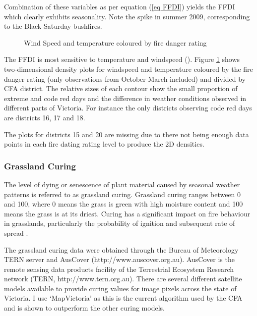 \documentclass[11pt,a4paper]{article}
\begin{document}
Combination of these variables as per equation (\ref{eq FFDI}) yields the FFDI which clearly exhibits seasonality. Note the spike in summer 2009, corresponding to the Black Saturday bushfires.

\begin{figure}[!ht]
	\centering 
	\caption{Wind Speed and temperature coloured by fire danger rating} 
	\label{fig:tw_fdr} 
\end{figure}

The FFDI is most sensitive to temperature and windspeed (\cite{dowdy10}). Figure \ref{fig:tw_fdr} shows two-dimensional density plots for windspeed and temperature coloured by the fire danger rating (only observations from October-March included) and divided by CFA district. The relative sizes of each contour show the small proportion of extreme and code red days and the difference in weather conditions observed in different parts of Victoria. For instance the only districts observing code red days are districts 16, 17 and 18. 

The plots for districts 15 and 20 are missing due to there not being enough data points in each fire dating rating level to produce the 2D densities.  
 
\subsubsection{Grassland Curing}
The level of dying or senescence of plant material caused by seasonal weather patterns is referred to as grassland curing. Grassland curing ranges between 0 and 100, where 0 means the grass is green with high moisture content and 100 means the grass is at its driest. Curing has a significant impact on fire behaviour in grasslands, particularly the probability of ignition and subsequent rate of spread \citep{cheney08}. 

The grassland curing data were obtained through the Bureau of Meteorology TERN server and AusCover (http://www.auscover.org.au). AusCover is the remote sensing data products facility of the Terrestrial Ecosystem Research network (TERN, http://www.tern.org.au). There are several different satellite models available to provide curing values for image pixels across the state of Victoria. I use `MapVictoria' \citep{martin15} as this is the current algorithm used by the CFA and is shown to outperform the other curing models. 
\end{document}
